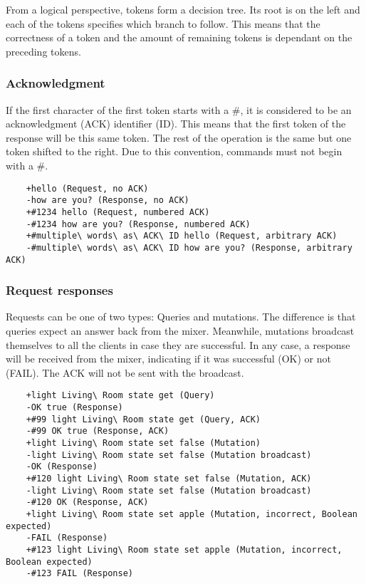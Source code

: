 \documentclass[../main.tex]{subfiles}
\begin{document}
From a logical perspective, tokens form a decision tree. Its root is on the left and each of the tokens specifies which branch to follow. This means that the correctness of a token and the amount of remaining tokens is dependant on the preceding tokens.\newline

\subsubsection{Acknowledgment}
If the first character of the first token starts with a \#, it is considered to be an acknowledgment (ACK) identifier (ID). This means that the first token of the response will be this same token. The rest of the operation is the same but one token shifted to the right. Due to this convention, commands must not begin with a \#. 

\begin{lstlisting}
    +hello (Request, no ACK)
    -how are you? (Response, no ACK)
    +#1234 hello (Request, numbered ACK)
    -#1234 how are you? (Response, numbered ACK)
    +#multiple\ words\ as\ ACK\ ID hello (Request, arbitrary ACK)
    -#multiple\ words\ as\ ACK\ ID how are you? (Response, arbitrary ACK)
\end{lstlisting}

\subsubsection{Request responses}
Requests can be one of two types: Queries and mutations. The difference is that queries expect an answer back from the mixer. Meanwhile, mutations broadcast themselves to all the clients in case they are successful. In any case, a response will be received from the mixer, indicating if it was successful (OK) or not (FAIL). The ACK will not be sent with the broadcast.

\begin{lstlisting}
    +light Living\ Room state get (Query)
    -OK true (Response)
    +#99 light Living\ Room state get (Query, ACK)
    -#99 OK true (Response, ACK)
    +light Living\ Room state set false (Mutation)
    -light Living\ Room state set false (Mutation broadcast)
    -OK (Response)
    +#120 light Living\ Room state set false (Mutation, ACK)
    -light Living\ Room state set false (Mutation broadcast)
    -#120 OK (Response, ACK)
    +light Living\ Room state set apple (Mutation, incorrect, Boolean expected)
    -FAIL (Response)
    +#123 light Living\ Room state set apple (Mutation, incorrect, Boolean expected)
    -#123 FAIL (Response)
\end{lstlisting}
\end{document}
